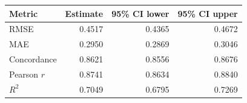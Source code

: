 \begin{tabular}{lrrr}
\toprule
Metric & Estimate & 95\% CI lower & 95\% CI upper \\
\midrule
RMSE & 0.4517 & 0.4365 & 0.4672 \\
MAE & 0.2950 & 0.2869 & 0.3046 \\
Concordance & 0.8621 & 0.8556 & 0.8676 \\
Pearson $r$ & 0.8741 & 0.8634 & 0.8840 \\
$R^2$ & 0.7049 & 0.6795 & 0.7269 \\
\bottomrule
\end{tabular}
